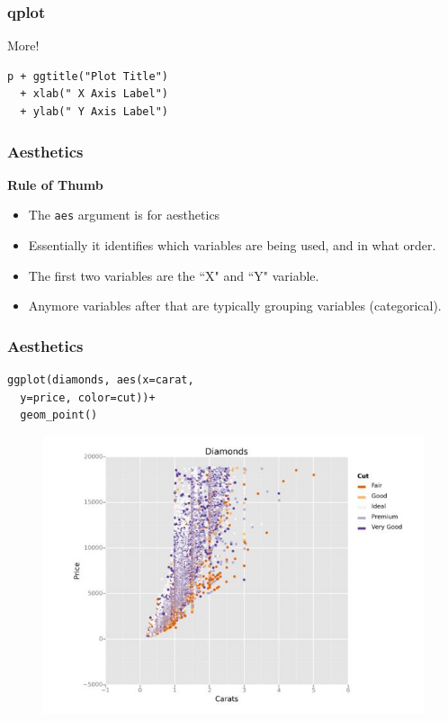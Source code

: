 \documentclass{beamer}
\begin{document}
\begin{frame}[fragile]
\frametitle{qplot}
\Large
\vspace{-2cm}
More!
\begin{framed}
\begin{verbatim}
p + ggtitle("Plot Title") 
  + xlab(" X Axis Label") 
  + ylab(" Y Axis Label")

\end{verbatim}
\end{framed}
\end{frame}

\begin{frame}
	\frametitle{Aesthetics}
	\Large
	\noindent \textbf{Rule of Thumb}
	\begin{itemize}
		\item The \texttt{aes} argument is for aesthetics
		\item Essentially it identifies which variables are being used, and in what order.
		\item The first two variables are the ``X" and ``Y" variable.
		\item Anymore variables after that are typically grouping variables (categorical).
	\end{itemize}
\end{frame}
\begin{frame}[fragile]
	\frametitle{Aesthetics}
	\Large
	\begin{framed}
		\begin{verbatim}
ggplot(diamonds, aes(x=carat, 
  y=price, color=cut))+
  geom_point()
	\end{verbatim}
\end{framed}

\end{frame}
\begin{frame}
	
	\begin{figure}
\centering
\includegraphics[width=1.1\linewidth]{aesthetic2}
\end{figure}

\end{frame}
\end{document}
